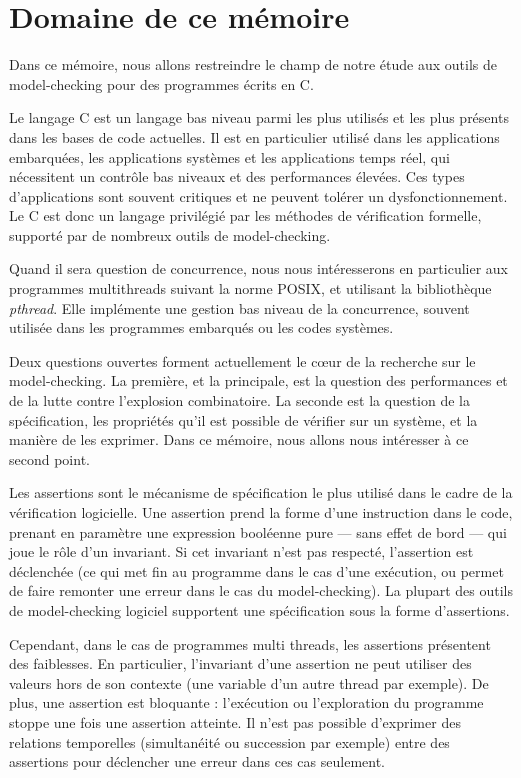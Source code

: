 \section{Domaine de ce mémoire}

Dans ce mémoire, nous allons restreindre le champ de notre étude aux
outils de model-checking pour des programmes écrits en C.

Le langage C est un langage bas niveau parmi les plus utilisés et les
plus présents dans les bases de code actuelles. Il est en particulier
utilisé dans les applications embarquées, les applications systèmes et
les applications temps réel, qui nécessitent un contrôle bas niveaux et
des performances élevées. Ces types d'applications sont souvent
critiques et ne peuvent tolérer un dysfonctionnement. Le C est donc un
langage privilégié par les méthodes de vérification formelle, supporté
par de nombreux outils de model-checking.

Quand il sera question de concurrence, nous nous intéresserons en
particulier aux programmes multithreads suivant la norme POSIX, et
utilisant la bibliothèque \emph{pthread}. Elle implémente une gestion
bas niveau de la concurrence, souvent utilisée dans les programmes
embarqués ou les codes systèmes.

Deux questions ouvertes forment actuellement le cœur de la recherche
sur le model-checking. La première, et la principale, est la question
des performances et de la lutte contre l'explosion combinatoire. La
seconde est la question de la spécification, les propriétés qu'il est
possible de vérifier sur un système, et la manière de les exprimer. Dans
ce mémoire, nous allons nous intéresser à ce second point.

Les assertions sont le mécanisme de spécification le plus utilisé dans
le cadre de la vérification logicielle. Une assertion prend la forme
d'une instruction dans le code, prenant en paramètre une expression
booléenne pure --- sans effet de bord --- qui joue le rôle d'un
invariant. Si cet invariant n'est pas respecté, l'assertion est
déclenchée (ce qui met fin au programme dans le cas d'une exécution, ou
permet de faire remonter une erreur dans le cas du model-checking). La
plupart des outils de model-checking logiciel supportent une
spécification sous la forme d'assertions.

Cependant, dans le cas de programmes multi threads, les assertions
présentent des faiblesses. En particulier, l'invariant d'une assertion
ne peut utiliser des valeurs hors de son contexte (une variable d'un
autre thread par exemple). De plus, une assertion est bloquante :
l'exécution ou l'exploration du programme stoppe une fois une assertion
atteinte. Il n'est pas possible d'exprimer des relations temporelles
(simultanéité ou succession par exemple) entre des assertions pour
déclencher une erreur dans ces cas seulement.

